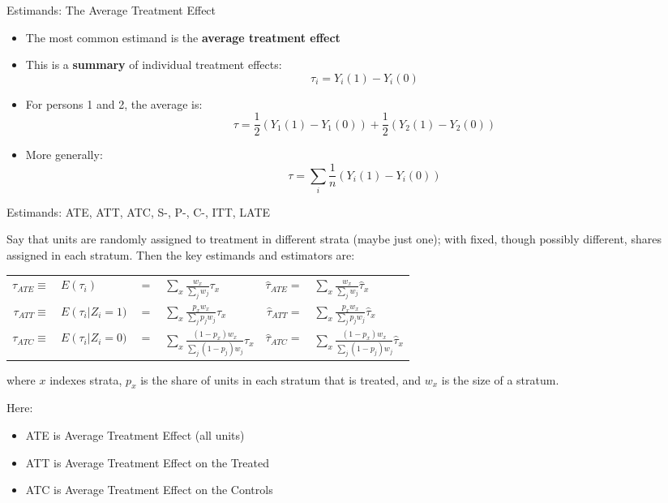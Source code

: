 \documentclass[11pt,ignorenonframetext,]{beamer}
\begin{document}
\begin{frame}{Estimands: The Average Treatment Effect}

\begin{itemize}
\item
  The most common estimand is the \textbf{average treatment effect}
\item
  This is a \textbf{summary} of individual treatment effects:
  \[\tau_i = Y_i(1) - Y_i(0)\]
\item
  For persons 1 and 2, the average is:
  \[\tau = \frac{1}{2}(Y_1(1) - Y_1(0)) + \frac{1}{2}(Y_2(1) - Y_2(0))\]
\item
  More generally: \[\tau = \sum_i\frac{1}{n}(Y_i(1) - Y_i(0))\]
\end{itemize}

\end{frame}

\begin{frame}{Estimands: ATE, ATT, ATC, S-, P-, C-, ITT, LATE}

Say that units are randomly assigned to treatment in different strata
(maybe just one); with fixed, though possibly different, shares assigned
in each stratum. Then the key estimands and estimators are: \scriptsize

\begin{table}[htbp] \scriptsize
    \centering
        \begin{tabular}{rlclrl} \scriptsize 
$\label{ATE} \tau_{ATE} \equiv$&$E\left(\tau_i\right) $&$=$&$ \sum\nolimits_{x} \frac{w_x}{\sum\nolimits_{j}w_{j}}\tau_x  $&$ \widehat{\tau}_{ATE} =$&$\sum\nolimits_{x} \frac{w_x}{\sum\nolimits_{j}w_{j}}\widehat{\tau}_x$ \\
$\label{ATT} \tau_{ATT} \equiv$&$E\left(\tau_i\right | Z_i = 1) $&=&$\sum\nolimits_{x} \frac{p_xw_x}{\sum\nolimits_{j}p_jw_j}\tau_x  $&$  \widehat{\tau}_{ATT} =$&$\sum\nolimits_{x} \frac{p_xw_x}{\sum\nolimits_{j}p_jw_j}\widehat{\tau}_x$ \\
$\label{ATC} \tau_{ATC} \equiv$&$E\left(\tau_i\right |  Z_i = 0) $&=&$\sum\nolimits_{x} \frac{(1-p_x)w_x}{\sum\nolimits_{j}(1-p_j)w_j}\tau_x  $&$ \widehat{\tau}_{ATC} =$&$\sum\nolimits_{x} \frac{(1-p_x)w_x}{\sum\nolimits_{j}(1-p_j)w_j}\widehat{\tau}_x $
        \end{tabular}
\end{table}

where \(x\) indexes strata, \(p_x\) is the share of units in each
stratum that is treated, and \(w_x\) is the size of a stratum.

Here:

\begin{itemize}
    \item ATE is Average Treatment Effect (all units)
    \item ATT is Average Treatment Effect on the Treated
    \item ATC is Average Treatment Effect on the Controls
    \end{itemize}

\end{frame}
\end{document}
